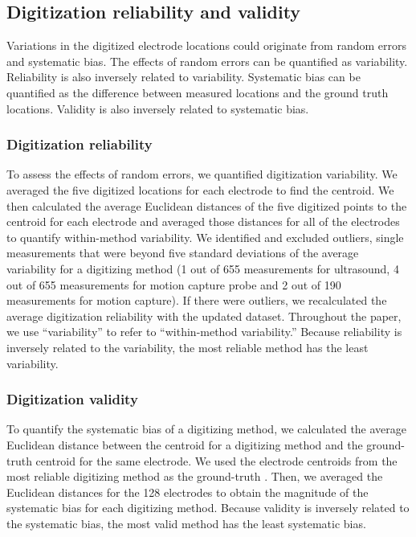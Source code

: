 \documentclass{UCF_ETD}
\renewcommand{\ul}{}
\begin{document}
\subsection{Digitization reliability and validity}
Variations in the digitized electrode locations could originate from random errors and systematic bias. The effects of random errors can be quantified as variability. Reliability is also inversely related to variability. Systematic bias can be quantified as the difference between measured locations and the ground truth locations. Validity is also inversely related to systematic bias.

\subsubsection{Digitization reliability}
\label{subsec:digitRel}
To assess the effects of random errors, we quantified digitization variability. We averaged the five digitized locations for each electrode to find the centroid. We then calculated the average Euclidean distances of the five digitized points to the centroid for each electrode and averaged those distances for all of the electrodes to quantify within-method variability. We identified and excluded outliers, single measurements that were beyond five standard deviations of the average variability for a digitizing method \ul{(1 out of 655 measurements for ultrasound, 4 out of 655 measurements for motion capture probe and 2 out of 190 measurements for motion capture)}. If there were outliers, we recalculated the average digitization reliability with the updated dataset. Throughout the paper, we use ``variability'' to refer to ``within-method variability.'' Because reliability is inversely related to the variability, the most reliable method has the least variability. 

\subsubsection{Digitization validity}
To quantify the systematic bias of a digitizing method, we calculated the average Euclidean distance between the centroid for a digitizing method and the ground-truth centroid for the same electrode. We used the electrode centroids from the most reliable digitizing method as the ground-truth \citep{Dalal2014-nk}. Then, we averaged the Euclidean distances for the 128 electrodes to obtain the magnitude of the systematic bias for each digitizing method. Because validity is inversely related to the systematic bias, the most valid method has the least systematic bias. 
\end{document}

